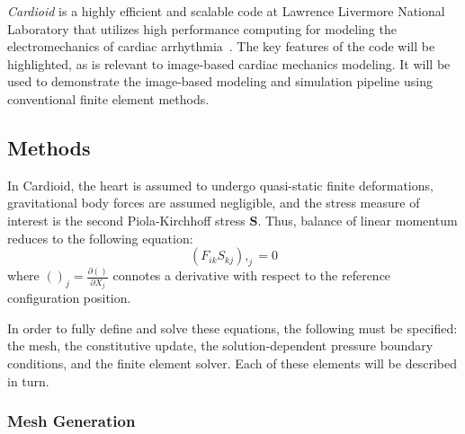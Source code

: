 \textit{Cardioid} is a highly efficient and scalable code at Lawrence Livermore National Laboratory that utilizes high performance computing for modeling the electromechanics of cardiac arrhythmia~\cite{richards_2013, gurev_2015}. The key features of the code will be highlighted, as is relevant to image-based cardiac mechanics modeling. It will be used to demonstrate the image-based modeling and simulation pipeline using conventional finite element methods.

\subsection{Methods}
\label{Methods}

In Cardioid, the heart is assumed to undergo quasi-static finite deformations, gravitational body forces are assumed negligible, and the stress measure of interest is the second Piola-Kirchhoff stress $\bm{S}$. Thus, balance of linear momentum reduces to the following equation:
\begin{equation}
(F_{ik}S_{kj}),_{j} = 0
\end{equation}
where $()_j = \frac{\partial ()}{\partial X_j}$ connotes a derivative with respect to the reference configuration position.

In order to fully define and solve these equations, the following must be specified: the mesh, the constitutive update, the solution-dependent pressure boundary conditions, and the finite element solver. Each of these elements will be described in turn.

\subsubsection{Mesh Generation}
\label{Mesh Generation}

